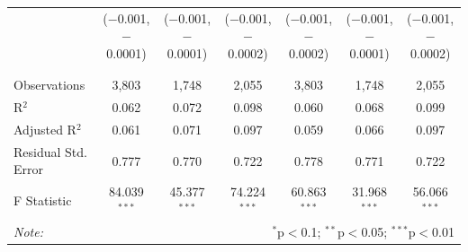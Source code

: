 \documentclass[alpha-refs]{wiley-article-01g}
\begin{document}
\begin{landscape}
\begin{table}[!htbp]
\begin{tabular}{@{\extracolsep{5pt}}lcccccc}
			& ($-$0.001, $-$0.0001) & ($-$0.001, $-$0.0001) & ($-$0.001, $-$0.0002) & ($-$0.001, $-$0.0002) & ($-$0.001, $-$0.0001) & ($-$0.001, $-$0.0002) \\ 
			& & & & & & \\ 
			\hline \\[-.8ex] 
			Observations & 3,803 & 1,748 & 2,055 & 3,803 & 1,748 & 2,055 \\ 
			R$^{2}$ & 0.062 & 0.072 & 0.098 & 0.060 & 0.068 & 0.099 \\ 
			Adjusted R$^{2}$ & 0.061 & 0.071 & 0.097 & 0.059 & 0.066 & 0.097 \\ 
			Residual Std. Error & 0.777 & 0.770 & 0.722 & 0.778 & 0.771 & 0.722 \\ 
			F Statistic & 84.039$^{***}$ & 45.377$^{***}$ & 74.224$^{***}$ & 60.863$^{***}$ & 31.968$^{***}$ & 56.066$^{***}$ \\ 
			\hline 
			\textit{Note:}  & \multicolumn{6}{r}{$^{*}$p$<$0.1; $^{**}$p$<$0.05; $^{***}$p$<$0.01} \\ 
		\end{tabular} 
	\end{table} 
	
\end{landscape}

\newpage
\end{document}
